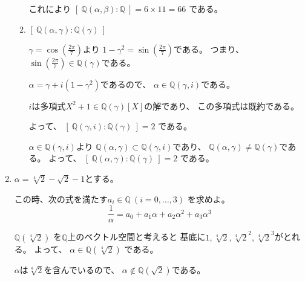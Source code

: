 \documentclass[12pt,b5paper]{ltjsarticle}
\begin{document}
\begin{enumerate}
\begin{enumerate}
            これにより
            $\left[ \: \mathbb{Q}(\alpha,\beta):\mathbb{Q} \: \right]
            = 6\times 11 = 66$
            である。

            \hrulefill
       \item
            $\left[ \: \mathbb{Q}(\alpha,\gamma):\mathbb{Q}(\gamma) \: \right]$

            \dotfill

            $\gamma = \cos\left(\frac{2\pi}{7}\right)$より
            $1-\gamma^2 = \sin\left(\frac{2\pi}{7}\right)$である。
            つまり、
            $\sin\left(\frac{2\pi}{7}\right) \in \mathbb{Q}(\gamma)$である。

            $\alpha = \gamma + i(1-\gamma^2)$であるので、
            $\alpha \in \mathbb{Q}(\gamma,i)$である。

            $i$は多項式$X^2+1 \in \mathbb{Q}(\gamma)[X]$の解であり、
            この多項式は既約である。

            よって、
            $\left[ \: \mathbb{Q}(\gamma,i):\mathbb{Q}(\gamma) \: \right]=2$
            である。

            $\alpha \in \mathbb{Q}(\gamma,i)$より
            $\mathbb{Q}(\alpha,\gamma) \subset \mathbb{Q}(\gamma,i)$であり、
            $\mathbb{Q}(\alpha,\gamma) \ne \mathbb{Q}(\gamma)$である。
            よって、
            $\left[ \: \mathbb{Q}(\alpha,\gamma):\mathbb{Q}(\gamma) \: \right]=2$
            である。


            \hrulefill

      \end{enumerate}

      \hrulefill
 \item
      $\alpha = \sqrt[4]{2} - \sqrt{2} -1$とする。

      この時、次の式を満たす$a_{i}\in\mathbb{Q} \: (i=0,\dots,3)$
      を求めよ。
      \begin{equation}
       \frac{1}{\alpha} = a_{0} + a_{1}\alpha  + a_{2}\alpha^{2} + a_{3}\alpha^{3}
      \end{equation}
      \dotfill

      $\mathbb{Q}(\sqrt[4]{2})$
      を$\mathbb{Q}$上のベクトル空間と考えると
      基底に$1,\sqrt[4]{2},\sqrt[4]{2}^{2},\sqrt[4]{2}^{3}$がとれる。
      よって、
      $\alpha \in \mathbb{Q}(\sqrt[4]{2})$
      である。

      $\alpha$は$\sqrt[4]{2}$を含んでいるので、
      $\alpha \not\in \mathbb{Q}(\sqrt{2})$である。


\end{enumerate}
\end{document}
